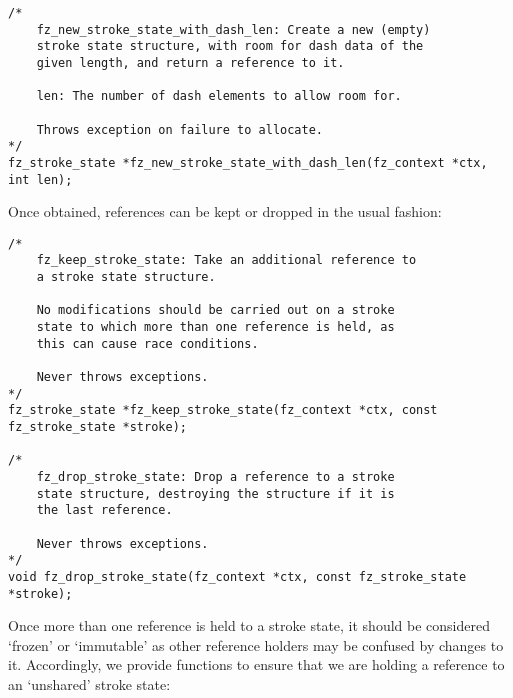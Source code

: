 \documentclass[oneside]{book}
\begin{document}
\begin{lstlisting}
/*
	fz_new_stroke_state_with_dash_len: Create a new (empty)
	stroke state structure, with room for dash data of the
	given length, and return a reference to it.

	len: The number of dash elements to allow room for.

	Throws exception on failure to allocate.
*/
fz_stroke_state *fz_new_stroke_state_with_dash_len(fz_context *ctx, int len);
\end{lstlisting}

Once obtained, references can be kept or dropped in the usual fashion:

\begin{lstlisting}
/*
	fz_keep_stroke_state: Take an additional reference to
	a stroke state structure.

	No modifications should be carried out on a stroke
	state to which more than one reference is held, as
	this can cause race conditions.

	Never throws exceptions.
*/
fz_stroke_state *fz_keep_stroke_state(fz_context *ctx, const fz_stroke_state *stroke);

/*
	fz_drop_stroke_state: Drop a reference to a stroke
	state structure, destroying the structure if it is
	the last reference.

	Never throws exceptions.
*/
void fz_drop_stroke_state(fz_context *ctx, const fz_stroke_state *stroke);
\end{lstlisting}

Once more than one reference is held to a stroke state, it should be considered `frozen' or `immutable' as other reference holders may be confused by changes to it. Accordingly, we provide functions to ensure that we are holding a reference to an `unshared' stroke state:
\end{document}
